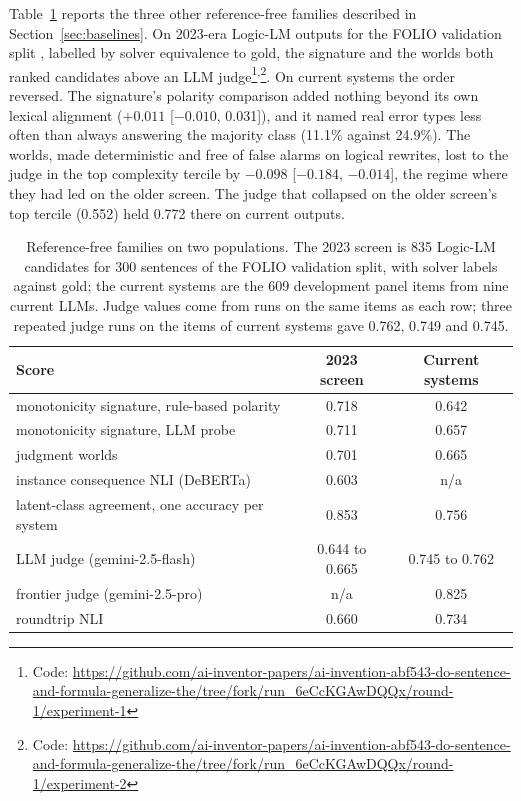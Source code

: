 \documentclass[11pt,letterpaper]{article}
\begin{document}
Table~\ref{tab:families} reports the three other reference-free families described in Section~\ref{sec:baselines}. On 2023-era Logic-LM outputs for the FOLIO validation split \citep{Pan2023}, labelled by solver equivalence to gold, the signature and the worlds both ranked candidates above an LLM judge\footnote{Code: \url{https://github.com/ai-inventor-papers/ai-invention-abf543-do-sentence-and-formula-generalize-the/tree/fork/run_6eCcKGAwDQQx/round-1/experiment-1}}\textsuperscript{,}\footnote{Code: \url{https://github.com/ai-inventor-papers/ai-invention-abf543-do-sentence-and-formula-generalize-the/tree/fork/run_6eCcKGAwDQQx/round-1/experiment-2}}. On current systems the order reversed. The signature's polarity comparison added nothing beyond its own lexical alignment ($+0.011$ [$-0.010$, 0.031]), and it named real error types less often than always answering the majority class (11.1\% against 24.9\%). The worlds, made deterministic and free of false alarms on logical rewrites, lost to the judge in the top complexity tercile by $-0.098$ [$-0.184$, $-0.014$], the regime where they had led on the older screen. The judge that collapsed on the older screen's top tercile (0.552) held 0.772 there on current outputs.

\begin{table}[!htbp]
  \centering
  \small
  \caption{Reference-free families on two populations. The 2023 screen is 835 Logic-LM candidates for 300 sentences of the FOLIO validation split, with solver labels against gold; the current systems are the 609 development panel items from nine current LLMs. Judge values come from runs on the same items as each row; three repeated judge runs on the items of current systems gave 0.762, 0.749 and 0.745.}
  \label{tab:families}
  \begin{tabular}{lcc}
    \toprule
    Score & 2023 screen & Current systems \\
    \midrule
    monotonicity signature, rule-based polarity & 0.718 & 0.642 \\
    monotonicity signature, LLM probe & 0.711 & 0.657 \\
    judgment worlds & 0.701 & 0.665 \\
    instance consequence NLI (DeBERTa) & 0.603 & n/a \\
    latent-class agreement, one accuracy per system & 0.853 & 0.756 \\
    LLM judge (gemini-2.5-flash) & 0.644 to 0.665 & 0.745 to 0.762 \\
    frontier judge (gemini-2.5-pro) & n/a & 0.825 \\
    roundtrip NLI & 0.660 & 0.734 \\
    \bottomrule
  \end{tabular}
\end{table}
\end{document}
